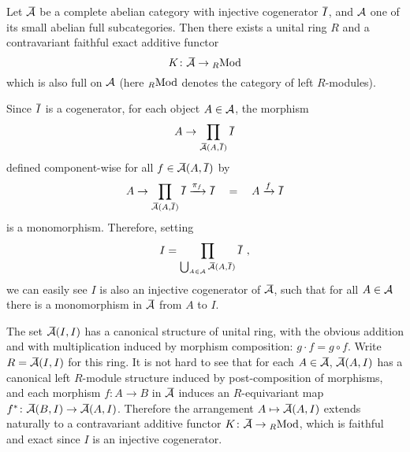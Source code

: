 \documentclass[twoside]{article}
\begin{document}
\begin{prop}\label{main}
Let $\bea$ be a complete abelian category with injective cogenerator $\Ibar$, and ${\mathcal{A}}$ one of its small abelian full subcategories. Then there exists a unital ring $R$ and a contravariant faithful exact additive  functor $$K\colon \bea \rightarrow \rmod$$ which is also full on ${\mathcal{A}}$ (here ${}_R\mathrm{Mod}$ denotes the category of left $R$-modules).
\end{prop}
\pf
Since $\Ibar$ is a cogenerator, for each object $A \in {\mathcal{A}}$, the morphism $$A \rightarrow \prod_{\bea(A, \Ibar)} \Ibar$$ defined component-wise for all $f \in \bea(A, \Ibar)$ by
$$A \rightarrow \prod_{\bea(A, \Ibar)} \Ibar \xrightarrow{\pi_f} \Ibar \quad = \quad A \xrightarrow{f} \Ibar$$
is a monomorphism. Therefore, setting $$I = \prod_{\bigcup_{A \in \EA} \bea(A, \Ibar)} \Ibar \ ,$$ we can easily see $I$ is also an injective cogenerator of $\bea$, such that for all $A \in {\mathcal{A}}$ there is a monomorphism in $\bea$ from $A$ to $I$. \vspace{\topsep}

The set $\bea(I,I)$ has a canonical structure of unital ring, with the obvious addition and with multiplication induced by morphism composition: $g \cdot f = g \circ f$. Write $R = \bea(I,I)$ for this ring. It is not hard to see that for each $A \in \bea$, $\bea(A,I)$ has a canonical left $R$-module structure induced by post-composition of morphisms, and each morphism $f\colon A \rightarrow B$ in $\bea$ induces an $R$-equivariant map $f^\ast\colon \bea(B, I) \rightarrow \bea(A,I)$. Therefore the arrangement $A \mapsto \bea(A,I)$ extends naturally to a contravariant additive functor $K\colon \bea \rightarrow \rmod$, which is faithful and exact since $I$ is an injective cogenerator.\vspace{\topsep}
\end{document}
